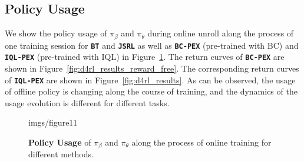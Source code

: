 \documentclass{article}
\newcommand{\alg}[1]{\textbf{\texttt{#1}}}
\begin{document}
\subsection{Policy Usage}
We show the policy usage of $\pi_{\beta}$ and $\pi_{\theta}$ during online unroll along the process of one training session for \alg{BT} and \alg{JSRL} as well as \alg{BC-PEX} (pre-trained with BC) and \alg{IQL-PEX} (pre-trained with IQL) in Figure~\ref{fig:policy_usage}.
The return curves of \alg{BC-PEX} are shown in Figure~\ref{fig:d4rl_results_reward_free}.
The corresponding return curves of \alg{IQL-PEX} are shown in Figure~\ref{fig:d4rl_results}.
As can be observed, the usage of offline policy is changing along the course of training, and the dynamics of the usage evolution is different for different tasks.






\begin{figure}[h]
	\centering
	\begin{overpic}[width=14cm]{imgs/figure11}
	\end{overpic}
	\caption{\textbf{Policy Usage} of $\pi_{\beta}$ and $\pi_{\theta}$ along the process of online training for different methods.}
	\label{fig:policy_usage}
\end{figure}
\end{document}
